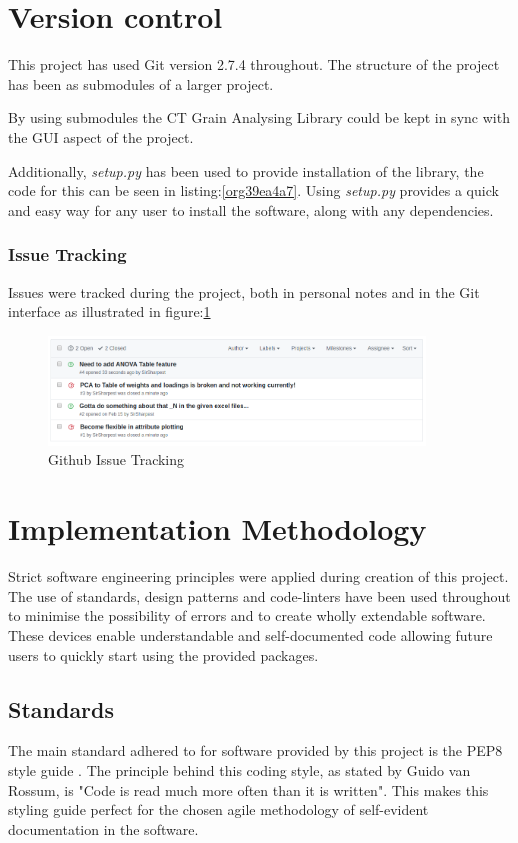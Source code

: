 \documentclass[11pt]{report}
\begin{document}
\section{Version control}
\label{sec:org2784320}
This project has used Git version 2.7.4 throughout. The structure of the project has been as submodules of a larger project.

By using submodules the CT Grain Analysing Library could be kept in sync with the GUI aspect of the project.

Additionally, \emph{setup.py} has been used to provide installation of the library, the code for this can be seen in listing:\ref{org39ea4a7}. Using \emph{setup.py} provides a quick and easy way for any user to install the software, along with any dependencies.

\subsubsection{Issue Tracking}
\label{sec:org32656d2}
Issues were tracked during the project, both in personal notes and in the Git interface as illustrated in figure:\ref{fig:orgba1d68c}
\begin{figure}[htbp]
\centering
\includegraphics[width=10cm]{./images/github.png}
\caption{\label{fig:orgba1d68c}
Github Issue Tracking}
\end{figure}

\section{Implementation Methodology}
\label{sec:org1ac5f39}
Strict software engineering principles were applied during creation of this project. The use of standards, design patterns and code-linters have been used throughout to minimise the possibility of errors and to create wholly extendable software. These devices enable understandable and self-documented code allowing future users to quickly start using the provided packages.
\subsection{Standards}
\label{sec:org994ab39}
The main standard adhered to for software provided by this project is the PEP8 style guide \cite{VanRossum}. The principle behind this coding style, as stated by Guido van Rossum, is "Code is read much more often than it is written". This makes this styling guide perfect for the chosen agile methodology of self-evident documentation in the software.
\end{document}
